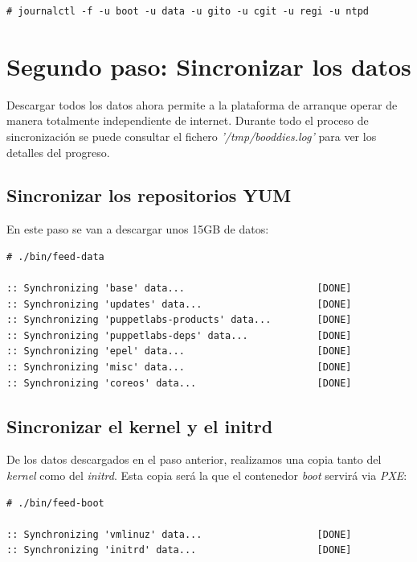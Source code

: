 \documentclass[a4paper,12pt,spanish,final]{epsc_tfc_pfc}
\begin{document}
\begin{lstlisting}[style=dnsmasq]
# journalctl -f -u boot -u data -u gito -u cgit -u regi -u ntpd
\end{lstlisting}

\section{Segundo paso: Sincronizar los datos}

Descargar todos los datos ahora permite a la plataforma de arranque operar de manera totalmente independiente de internet. Durante todo el proceso de sincronización se puede consultar el fichero \emph{'/tmp/booddies.log'} para ver los detalles del progreso.

\subsection{Sincronizar los repositorios YUM}

En este paso se van a descargar unos 15GB de datos:\\

\begin{lstlisting}[style=dnsmasq]
# ./bin/feed-data

:: Synchronizing 'base' data...                       [DONE]
:: Synchronizing 'updates' data...                    [DONE]
:: Synchronizing 'puppetlabs-products' data...        [DONE]
:: Synchronizing 'puppetlabs-deps' data...            [DONE]
:: Synchronizing 'epel' data...                       [DONE]
:: Synchronizing 'misc' data...                       [DONE]
:: Synchronizing 'coreos' data...                     [DONE]
\end{lstlisting}

\subsection{Sincronizar el kernel y el initrd}

De los datos descargados en el paso anterior, realizamos una copia tanto del \emph{kernel} como del \emph{initrd}. Esta copia será la que el contenedor \emph{boot} servirá via \emph{PXE}:\\

\begin{lstlisting}[style=dnsmasq]
# ./bin/feed-boot

:: Synchronizing 'vmlinuz' data...                    [DONE]
:: Synchronizing 'initrd' data...                     [DONE]
\end{lstlisting}
\end{document}
